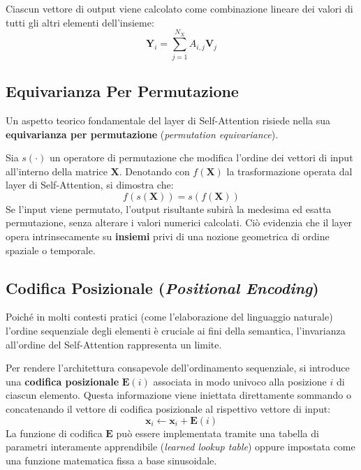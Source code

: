﻿\documentclass[11pt, a4paper]{article}
\begin{document}
Ciascun vettore di output viene calcolato come combinazione lineare dei valori di tutti gli altri elementi dell'insieme:
\[ \boxed{\bm{Y}_i = \sum_{j=1}^{N_X} A_{i,j} \bm{V}_j} \]

\subsection{Equivarianza Per Permutazione}

Un aspetto teorico fondamentale del layer di Self-Attention risiede nella sua \textbf{equivarianza per permutazione} (\emph{permutation equivariance}).


Sia $s(\cdot)$ un operatore di permutazione che modifica l'ordine dei vettori di input all'interno della matrice $\bm{X}$. Denotando con $f(\bm{X})$ la trasformazione operata dal layer di Self-Attention, si dimostra che:
\[ \boxed{f(s(\bm{X})) = s(f(\bm{X}))} \]
Se l'input viene permutato, l'output risultante subirà la medesima ed esatta permutazione, senza alterare i valori numerici calcolati. Ciò evidenzia che il layer opera intrinsecamente su \textbf{insiemi} privi di una nozione geometrica di ordine spaziale o temporale.

\subsection{Codifica Posizionale (\emph{Positional Encoding})}

Poiché in molti contesti pratici (come l'elaborazione del linguaggio naturale) l'ordine sequenziale degli elementi è cruciale ai fini della semantica, l'invarianza all'ordine del Self-Attention rappresenta un limite.


Per rendere l'architettura consapevole dell'ordinamento sequenziale, si introduce una \textbf{codifica posizionale} $\bm{E}(i)$ associata in modo univoco alla posizione $i$ di ciascun elemento. Questa informazione viene iniettata direttamente sommando o concatenando il vettore di codifica posizionale al rispettivo vettore di input:
\[ \bm{x}_i \leftarrow \bm{x}_i + \bm{E}(i) \]
La funzione di codifica $\bm{E}$ può essere implementata tramite una tabella di parametri interamente apprendibile (\emph{learned lookup table}) oppure impostata come una funzione matematica fissa a base sinusoidale.
\end{document}
